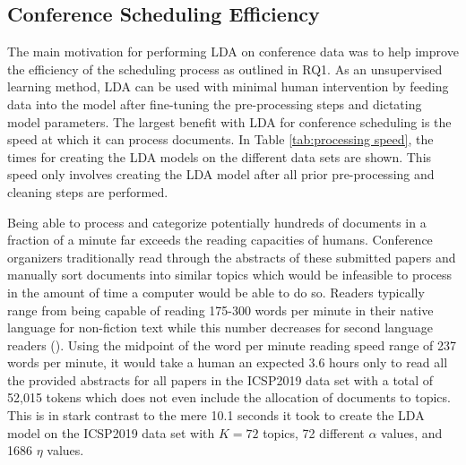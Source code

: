 \documentclass[a4paper, 12pt, twoside]{article}
\numberwithin{equation}{section} %
\begin{document}
\subsection{Conference Scheduling Efficiency}

The main motivation for performing LDA on conference data was to help improve the efficiency of the scheduling process as outlined in RQ1. As an unsupervised learning method, LDA can be used with minimal human intervention by feeding data into the model after fine-tuning the pre-processing steps and dictating model parameters. The largest benefit with LDA for conference scheduling is the speed at which it can process documents. In Table \ref{tab:processing speed}, the times for creating the LDA models on the different data sets are shown. This speed only involves creating the LDA model after all prior pre-processing and cleaning steps are performed. 

\begin{table}[H]
\centering
{}
\caption[LDA model processing times]{Processing times for each data set using 16 GB of RAM and an Intel i7 3.70 GHz CPU.}
\label{tab:processing speed}
\end{table}

Being able to process and categorize potentially hundreds of documents in a fraction of a minute far exceeds the reading capacities of humans. Conference organizers traditionally read through the abstracts of these submitted papers and manually sort documents into similar topics which would be infeasible to process in the amount of time a computer would be able to do so. Readers typically range from being capable of reading 175-300 words per minute in their native language for non-fiction text while this number decreases for second language readers (\cite{brysbaert2019}). Using the midpoint of the word per minute reading speed range of 237 words per minute, it would take a human an expected 3.6 hours only to read all the provided abstracts for all papers in the ICSP2019 data set with a total of 52,015 tokens which does not even include the allocation of documents to topics. This is in stark contrast to the mere 10.1 seconds it took to create the LDA model on the ICSP2019 data set with $K = 72$ topics, 72 different $\alpha$ values, and 1686 $\eta$ values. 
\end{document}
